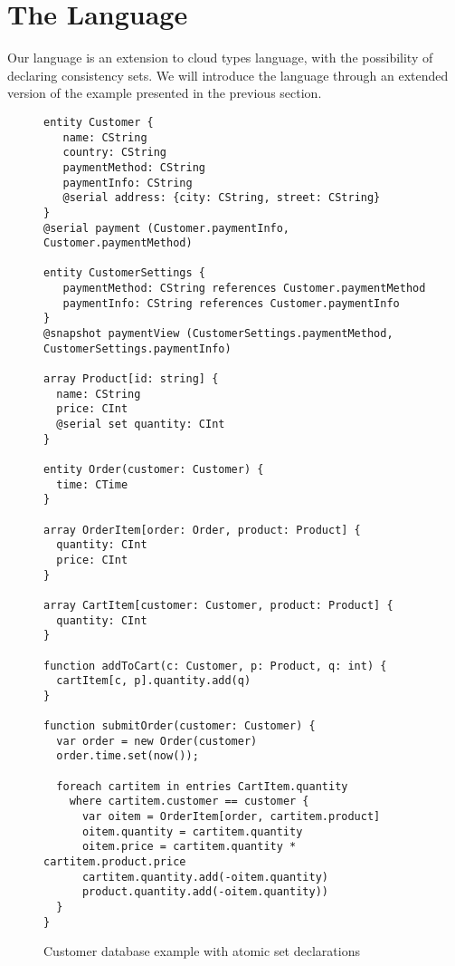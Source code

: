 

\section{The  Language} 

Our language is an extension to cloud types language, with the possibility of
declaring consistency sets. We will introduce the language through an extended
version of the example presented in the previous section. 

%
\begin{figure}[tp]
\begin{lstlisting}
entity Customer {
   name: CString 
   country: CString
   paymentMethod: CString
   paymentInfo: CString
   @serial address: {city: CString, street: CString}
}
@serial payment (Customer.paymentInfo, Customer.paymentMethod)

entity CustomerSettings {
   paymentMethod: CString references Customer.paymentMethod
   paymentInfo: CString references Customer.paymentInfo
}
@snapshot paymentView (CustomerSettings.paymentMethod, CustomerSettings.paymentInfo)

array Product[id: string] {
  name: CString
  price: CInt
  @serial set quantity: CInt 
}

entity Order(customer: Customer) {
  time: CTime
}

array OrderItem[order: Order, product: Product] {
  quantity: CInt
  price: CInt
}

array CartItem[customer: Customer, product: Product] {
  quantity: CInt
}

function addToCart(c: Customer, p: Product, q: int) {
  cartItem[c, p].quantity.add(q)
}

function submitOrder(customer: Customer) {
  var order = new Order(customer)
  order.time.set(now());

  foreach cartitem in entries CartItem.quantity 
    where cartitem.customer == customer {
      var oitem = OrderItem[order, cartitem.product]
      oitem.quantity = cartitem.quantity
      oitem.price = cartitem.quantity * cartitem.product.price
      cartitem.quantity.add(-oitem.quantity)
      product.quantity.add(-oitem.quantity))
  }
}
\end{lstlisting}
\caption{Customer database example with atomic set declarations}
\end{figure}
\label{lst:ctStoreSets}
\
%    

